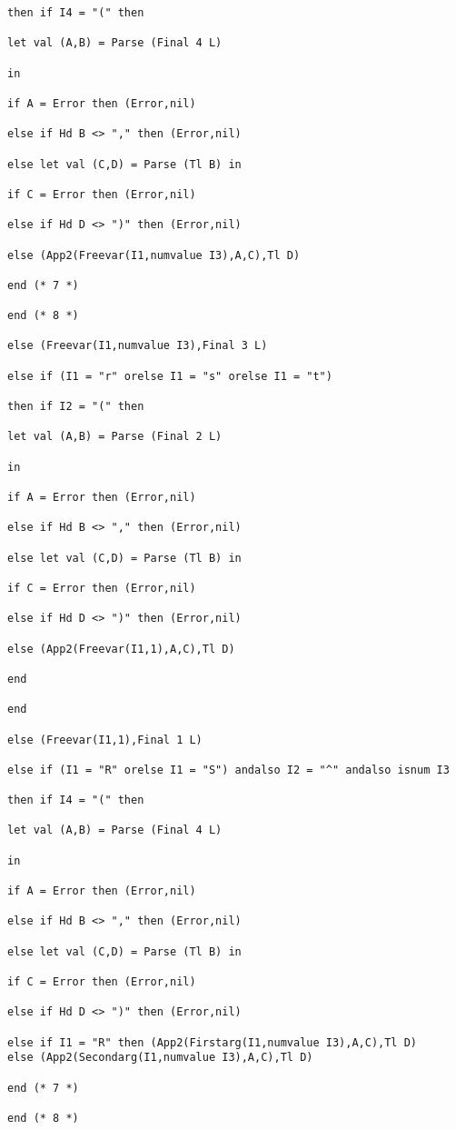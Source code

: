 \documentclass{article}
\begin{document}
{{\begin{verbatim}
then if I4 = "(" then

let val (A,B) = Parse (Final 4 L)

in

if A = Error then (Error,nil)

else if Hd B <> "," then (Error,nil)

else let val (C,D) = Parse (Tl B) in

if C = Error then (Error,nil)

else if Hd D <> ")" then (Error,nil)

else (App2(Freevar(I1,numvalue I3),A,C),Tl D)

end (* 7 *)

end (* 8 *)

else (Freevar(I1,numvalue I3),Final 3 L)

else if (I1 = "r" orelse I1 = "s" orelse I1 = "t")

then if I2 = "(" then

let val (A,B) = Parse (Final 2 L)

in

if A = Error then (Error,nil)

else if Hd B <> "," then (Error,nil)

else let val (C,D) = Parse (Tl B) in

if C = Error then (Error,nil)

else if Hd D <> ")" then (Error,nil)

else (App2(Freevar(I1,1),A,C),Tl D)

end

end

else (Freevar(I1,1),Final 1 L)

else if (I1 = "R" orelse I1 = "S") andalso I2 = "^" andalso isnum I3

then if I4 = "(" then

let val (A,B) = Parse (Final 4 L)

in

if A = Error then (Error,nil)

else if Hd B <> "," then (Error,nil)

else let val (C,D) = Parse (Tl B) in

if C = Error then (Error,nil)

else if Hd D <> ")" then (Error,nil)

else if I1 = "R" then (App2(Firstarg(I1,numvalue I3),A,C),Tl D)
else (App2(Secondarg(I1,numvalue I3),A,C),Tl D)

end (* 7 *)

end (* 8 *)


\end{verbatim}}}
\end{document}
